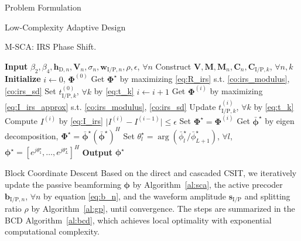 \documentclass[journal]{IEEEtran}
\begin{document}
\begin{section}{Problem Formulation}
\begin{subsection}{Low-Complexity Adaptive Design}
			\begin{algorithm}[!t]
				\caption{M-SCA: IRS Phase Shift.}
				\label{al:m_sca}
				\begin{algorithmic}[1]
					\State \textbf{Input} $\beta_2,\beta_4,\boldsymbol{h}_{\mathrm{D},n},\boldsymbol{V}_{n},\sigma_n,\boldsymbol{w}_{\mathrm{I/P},n},\rho,\epsilon$, $\forall n$
					\State Construct $\boldsymbol{V},\boldsymbol{M},\boldsymbol{M}_n,\boldsymbol{C}_{n},\boldsymbol{C}_{\mathrm{I/P},k}$, $\forall n,k$
					\State \textbf{Initialize} $i \gets 0$, $\boldsymbol{\Phi}^{(0)}$
						\State Get $\boldsymbol{\Phi}^{\star}$ by maximizing \eqref{eq:R_irs} s.t. \eqref{co:irs_modulus}, \eqref{co:irs_sd}
					\Else
						\State Set $t_{\mathrm{I/P},k}^{(0)}$, $\forall k$ by \eqref{eq:t_k}
						\Repeat
							\State $i \gets i + 1$
								\State Get $\boldsymbol{\Phi}^{(i)}$ by maximizing \eqref{eq:I_irs_approx} s.t. \eqref{co:irs_modulus}, \eqref{co:irs_sd}
								\State Update $t_{\mathrm{I/P},k}^{(i)}$, $\forall k$ by \eqref{eq:t_k}
								\State Compute $I^{(i)}$ by \eqref{eq:I_irs}
						\Until $\lvert I^{(i)}-I^{(i-1)} \rvert \le \epsilon$
						\State Set $\boldsymbol{\Phi}^{\star}=\boldsymbol{\Phi}^{(i)}$
					\EndIf
					\State Get $\bar{\boldsymbol{\phi}}^\star$ by eigen decomposition, $\boldsymbol{\Phi}^{\star}=\bar{\boldsymbol{\phi}}^\star(\bar{\boldsymbol{\phi}}^\star)^H$
					\State Set $\theta_l^\star=\arg(\bar{\phi}_l^\star/\bar{\phi}_{L+1}^\star)$, $\forall l$, $\boldsymbol{\phi}^{\star}=[e^{j\theta_1^\star},\dots,e^{j\theta_L^\star}]^H$
					\State \textbf{Output} $\boldsymbol{\phi}^{\star}$
				\end{algorithmic}
			\end{algorithm}
		\end{subsection}


		\begin{subsection}{Block Coordinate Descent}
			Based on the direct and cascaded CSIT, we iteratively update the passive beamforming $\boldsymbol{\phi}$ by Algorithm~\ref{al:sca}, the active precoder $\boldsymbol{b}_{\mathrm{I/P},n}$, $\forall n$ by equation \eqref{eq:b_n}, and the waveform amplitude $\boldsymbol{s}_{\mathrm{I/P}}$ and splitting ratio $\rho$ by Algorithm~\ref{al:gp}, until convergence. The steps are summarized in the BCD Algorithm~\ref{al:bcd}, which achieves local optimality with exponential computational complexity.


\end{subsection}
\end{section}
\end{document}

